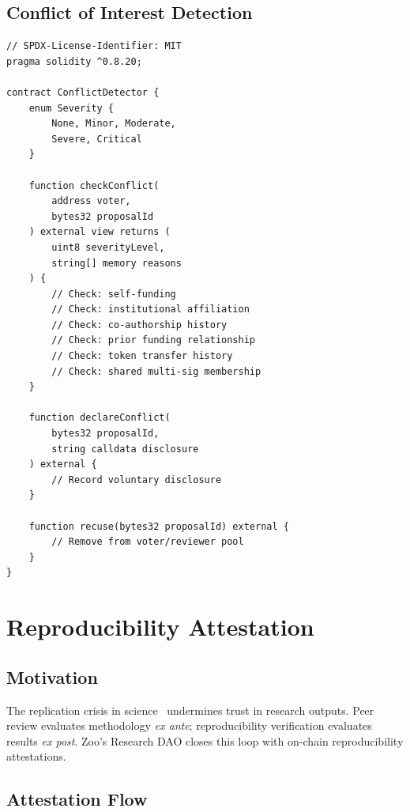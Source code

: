 \documentclass[11pt,letterpaper]{article}
\begin{document}
\subsection{Conflict of Interest Detection}

\begin{lstlisting}[language=Solidity,caption=COI detection interface]
// SPDX-License-Identifier: MIT
pragma solidity ^0.8.20;

contract ConflictDetector {
    enum Severity {
        None, Minor, Moderate,
        Severe, Critical
    }

    function checkConflict(
        address voter,
        bytes32 proposalId
    ) external view returns (
        uint8 severityLevel,
        string[] memory reasons
    ) {
        // Check: self-funding
        // Check: institutional affiliation
        // Check: co-authorship history
        // Check: prior funding relationship
        // Check: token transfer history
        // Check: shared multi-sig membership
    }

    function declareConflict(
        bytes32 proposalId,
        string calldata disclosure
    ) external {
        // Record voluntary disclosure
    }

    function recuse(bytes32 proposalId) external {
        // Remove from voter/reviewer pool
    }
}
\end{lstlisting}

\section{Reproducibility Attestation}
\label{sec:reproducibility}

\subsection{Motivation}

The replication crisis in science~\cite{ioannidis2005most} undermines trust in research outputs. Peer review evaluates methodology \emph{ex ante}; reproducibility verification evaluates results \emph{ex post}. Zoo's Research DAO closes this loop with on-chain reproducibility attestations.

\subsection{Attestation Flow}
\end{document}
